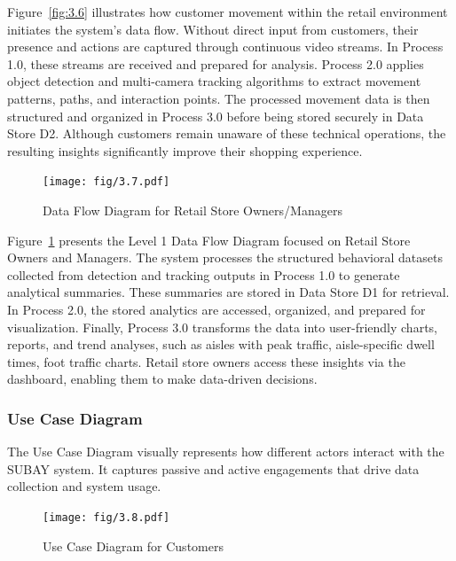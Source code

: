 {\vspace{1em}

Figure~\ref{fig:3.6} illustrates how customer movement within the retail environment initiates the system’s data flow. Without direct input from customers, their presence and actions are captured through continuous video streams. In Process 1.0, these streams are received and prepared for analysis. Process 2.0 applies object detection and multi-camera tracking algorithms to extract movement patterns, paths, and interaction points. The processed movement data is then structured and organized in Process 3.0 before being stored securely in Data Store D2. Although customers remain unaware of these technical operations, the resulting insights significantly improve their shopping experience.

\begin{figure}[H]
	\caption[Data Flow Diagram for Retail Store Owners/Managers]{\newline \newline Data Flow Diagram for Retail Store Owners/Managers}
	\centering
	\texttt{[image: fig/3.7.pdf]}
	\label{fig:3.7}
\end{figure}

Figure~\ref{fig:3.7} presents the Level 1 Data Flow Diagram focused on Retail Store Owners and Managers. The system processes the structured behavioral datasets collected from detection and tracking outputs in Process 1.0 to generate analytical summaries. These summaries are stored in Data Store D1 for retrieval. In Process 2.0, the stored analytics are accessed, organized, and prepared for visualization. Finally, Process 3.0 transforms the data into user-friendly charts, reports, and trend analyses, such as aisles with peak traffic, aisle-specific dwell times, foot traffic charts. Retail store owners access these insights via the dashboard, enabling them to make data-driven decisions.

\subsubsection{Use Case Diagram}
The Use Case Diagram visually represents how different actors interact with the SUBAY system. It captures passive and active engagements that drive data collection and system usage.

\begin{figure}[H]
	\caption[Use Case Diagram for Customers]{\newline \newline Use Case Diagram for Customers}
	\centering
	\texttt{[image: fig/3.8.pdf]}
	\label{fig:3.8}
\end{figure}

}

